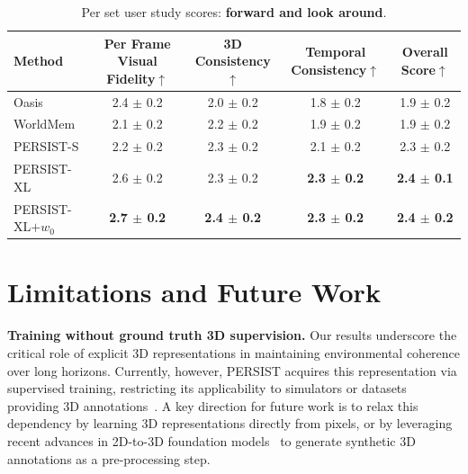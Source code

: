 \documentclass{article}
\theoremstyle{plain}
\theoremstyle{definition}
\theoremstyle{remark}
\begin{document}
\begin{table}[htb!]
\caption{Per set user study scores: \textbf{forward and look around}.}
\label{tab:user_study_scores_forward_and_look_around}
\centering
\begin{tabular}{lcccc}
\toprule
Method & Per Frame Visual Fidelity$\uparrow$ & 3D Consistency$\uparrow$ & Temporal Consistency$\uparrow$ & Overall Score$\uparrow$ \\
\midrule
Oasis & 2.4 $\pm$ 0.2 & 2.0 $\pm$ 0.2 & 1.8 $\pm$ 0.2 & 1.9 $\pm$ 0.2 \\
WorldMem & 2.1 $\pm$ 0.2 & 2.2 $\pm$ 0.2 & 1.9 $\pm$ 0.2 & 1.9 $\pm$ 0.2 \\
PERSIST-S & 2.2 $\pm$ 0.2 & 2.3 $\pm$ 0.2 & 2.1 $\pm$ 0.2 & 2.3 $\pm$ 0.2 \\
PERSIST-XL & 2.6 $\pm$ 0.2 & 2.3 $\pm$ 0.2 & \textbf{2.3 $\pm$ 0.2} & \textbf{2.4 $\pm$ 0.1} \\
PERSIST-XL$+w_0$ & \textbf{2.7 $\pm$ 0.2} & \textbf{2.4 $\pm$ 0.2} & \textbf{2.3 $\pm$ 0.2} & \textbf{2.4 $\pm$ 0.2} \\\bottomrule
\end{tabular}
\end{table}



\clearpage

\section{Limitations and Future Work}\label{app:limitations}

\textbf{Training without ground truth 3D supervision.} Our results underscore the critical role of explicit 3D representations in maintaining environmental coherence over long horizons. Currently, however, PERSIST acquires this representation via supervised training, restricting its applicability to simulators or datasets providing 3D annotations~\citep[e.g.][]{zhou2018stereo,Matterport3D,yeshwanth2023scannet++}. A key direction for future work is to relax this dependency by learning 3D representations directly from pixels, or by leveraging recent advances in 2D-to-3D foundation models~\citep{wang2025vggt,sam3dteam2025sam3d3dfyimages} to generate synthetic 3D annotations as a pre-processing step.
\end{document}
